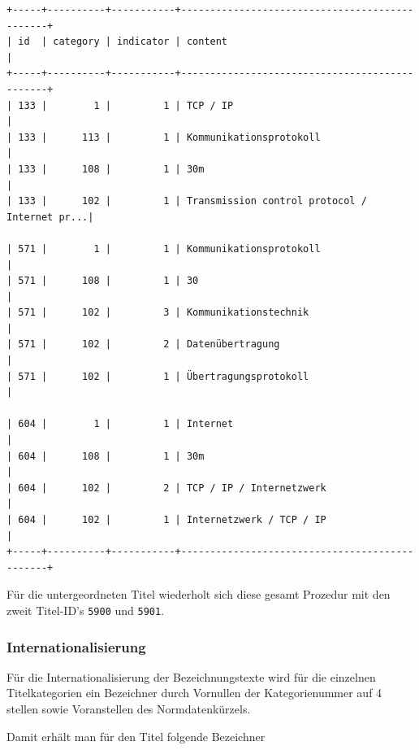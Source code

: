 \documentclass[11pt, twoside, a4paper, BCOR8mm, DIV12, bibtotoc,idxtotoc]{scrbook}
\begin{document}
\begin{shadowenv}
\begin{center}
\begin{verbatim}
+-----+----------+-----------+-----------------------------------------------+
| id  | category | indicator | content                                       |
+-----+----------+-----------+-----------------------------------------------+
| 133 |        1 |         1 | TCP / IP                                      |
| 133 |      113 |         1 | Kommunikationsprotokoll                       |
| 133 |      108 |         1 | 30m                                           |
| 133 |      102 |         1 | Transmission control protocol / Internet pr...|

| 571 |        1 |         1 | Kommunikationsprotokoll                       |
| 571 |      108 |         1 | 30                                            |
| 571 |      102 |         3 | Kommunikationstechnik                         |
| 571 |      102 |         2 | Datenübertragung                              |
| 571 |      102 |         1 | Übertragungsprotokoll                         |

| 604 |        1 |         1 | Internet                                      |
| 604 |      108 |         1 | 30m                                           |
| 604 |      102 |         2 | TCP / IP / Internetzwerk                      |
| 604 |      102 |         1 | Internetzwerk / TCP / IP                      |
+-----+----------+-----------+-----------------------------------------------+
\end{verbatim}
\end{center}
\end{shadowenv}

Für die untergeordneten Titel wiederholt sich diese gesamt Prozedur
mit den zweit Titel-ID's \texttt{5900} und \texttt{5901}.

\subsubsection{Internationalisierung}

Für die Internationalisierung der Bezeichnungstexte wird für die
einzelnen Titelkategorien ein Bezeichner durch Vornullen der
Kategorienummer auf 4 stellen sowie Voranstellen des Normdatenkürzels.

Damit erhält man für den Titel folgende Bezeichner
\end{document}
